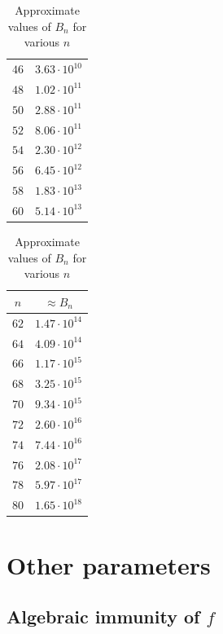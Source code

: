 \documentclass[11pt]{llncs}
\begin{document}
\begin{table}
\begin{minipage}{0.24\textwidth}
\begin{tabular}{|c|c|}
			$46$ & $3.63 \cdot 10^{10}$ \\
			$48$ & $1.02 \cdot 10^{11}$ \\
			$50$ & $2.88 \cdot 10^{11}$ \\
			$52$ & $8.06 \cdot 10^{11}$ \\
			$54$ & $2.30 \cdot 10^{12}$ \\
			$56$ & $6.45 \cdot 10^{12}$ \\
			$58$ & $1.83 \cdot 10^{13}$ \\
			$60$ & $5.14 \cdot 10^{13}$ \\
			\hline
		\end{tabular}
	\end{minipage}%
	\begin{minipage}{0.24\textwidth}
		\centering
		\begin{tabular}{|c|c|}
			\hline
			$n$ & $\approx B_n$ \\
			\hline
			$62$ & $1.47 \cdot 10^{14}$ \\
			$64$ & $4.09 \cdot 10^{14}$ \\
			$66$ & $1.17 \cdot 10^{15}$ \\
			$68$ & $3.25 \cdot 10^{15}$ \\
			$70$ & $9.34 \cdot 10^{15}$ \\
			$72$ & $2.60 \cdot 10^{16}$ \\
			$74$ & $7.44 \cdot 10^{16}$ \\
			$76$ & $2.08 \cdot 10^{17}$ \\
			$78$ & $5.97 \cdot 10^{17}$ \\
			$80$ & $1.65 \cdot 10^{18}$ \\
			\hline
		\end{tabular}
	\end{minipage}
	\caption{Approximate values of $B_n$ for various $n$}
	\label{table:walsh_bounds}
\end{table}







\section{Other parameters}
\subsection{Algebraic immunity of $f$}
\end{document}
